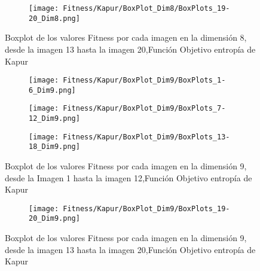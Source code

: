 \documentclass[conference]{IEEEtran}
\begin{document}
\begin{figure}
    \centering
    \begin{subfigure}{0.5\textwidth}
        \texttt{[image: Fitness/Kapur/BoxPlot\_Dim8/BoxPlots\_19-20\_Dim8.png]}
        \vspace{-150pt} %
    \end{subfigure}
    \caption{Boxplot de los valores Fitness por cada imagen en la dimensión 8, desde la imagen 13 hasta la imagen 20,Función Objetivo entropía de Kapur}
    \label{fig:imagenes}    
\end{figure}
\begin{figure}
    \centering

    \begin{subfigure}{0.5\textwidth}
        \texttt{[image: Fitness/Kapur/BoxPlot\_Dim9/BoxPlots\_1-6\_Dim9.png]}
    \end{subfigure}
    
    \begin{subfigure}{0.5\textwidth}
        \texttt{[image: Fitness/Kapur/BoxPlot\_Dim9/BoxPlots\_7-12\_Dim9.png]}
    \end{subfigure}
         \begin{subfigure}{0.5\textwidth}
        \texttt{[image: Fitness/Kapur/BoxPlot\_Dim9/BoxPlots\_13-18\_Dim9.png]}
    \end{subfigure}
    \caption{Boxplot de los valores Fitness por cada imagen en la dimensión 9, desde la Imagen 1 hasta la imagen 12,Función Objetivo entropía de Kapur}
\label{fig:imagenes}    
\end{figure}

\begin{figure}
    \centering
    \begin{subfigure}{0.5\textwidth}
        \texttt{[image: Fitness/Kapur/BoxPlot\_Dim9/BoxPlots\_19-20\_Dim9.png]}
        \vspace{-1pt} %
    \end{subfigure}
    \caption{Boxplot de los valores Fitness por cada imagen en la dimensión 9, desde la imagen 13 hasta la imagen 20,Función Objetivo entropía de Kapur}
    \label{fig:imagenes}    
\end{figure}

\end{document}
